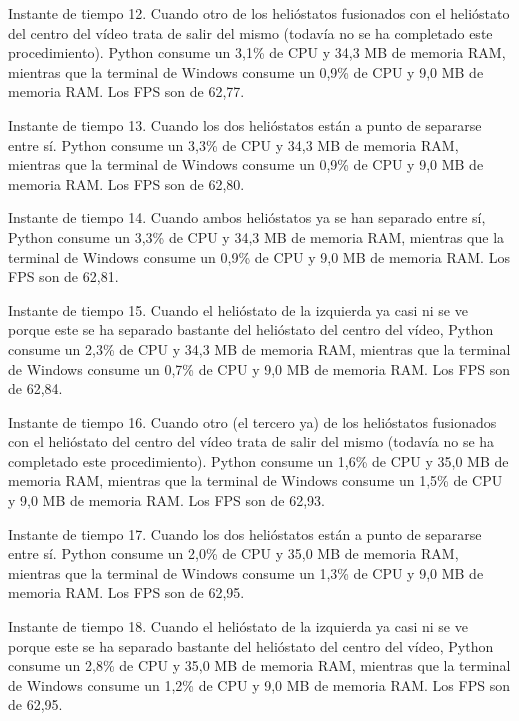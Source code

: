 \documentclass[12pt]{article}
\begin{document}
Instante de tiempo 12. Cuando otro de los helióstatos fusionados con el helióstato del centro del vídeo trata de salir del mismo (todavía no se ha completado este procedimiento). Python consume un 3,1\% de CPU y 34,3 MB de memoria RAM, mientras que la terminal de Windows consume un 0,9\% de CPU y 9,0 MB de memoria RAM. Los FPS son de 62,77.




Instante de tiempo 13. Cuando los dos helióstatos están a punto de separarse entre sí. Python consume un 3,3\% de CPU y 34,3 MB de memoria RAM, mientras que la terminal de Windows consume un 0,9\% de CPU y 9,0 MB de memoria RAM. Los FPS son de 62,80.




Instante de tiempo 14. Cuando ambos helióstatos ya se han separado entre sí, Python consume un 3,3\% de CPU y 34,3 MB de memoria RAM, mientras que la terminal de Windows consume un 0,9\% de CPU y 9,0 MB de memoria RAM. Los FPS son de 62,81.




Instante de tiempo 15. Cuando el helióstato de la izquierda ya casi ni se ve porque este se ha separado bastante del helióstato del centro del vídeo, Python consume un 2,3\% de CPU y 34,3 MB de memoria RAM, mientras que la terminal de Windows consume un 0,7\% de CPU y 9,0 MB de memoria RAM. Los FPS son de 62,84.




Instante de tiempo 16. Cuando otro (el tercero ya) de los helióstatos fusionados con el helióstato del centro del vídeo trata de salir del mismo (todavía no se ha completado este procedimiento). Python consume un 1,6\% de CPU y 35,0 MB de memoria RAM, mientras que la terminal de Windows consume un 1,5\% de CPU y 9,0 MB de memoria RAM. Los FPS son de 62,93.




Instante de tiempo 17. Cuando los dos helióstatos están a punto de separarse entre sí. Python consume un 2,0\% de CPU y 35,0 MB de memoria RAM, mientras que la terminal de Windows consume un 1,3\% de CPU y 9,0 MB de memoria RAM. Los FPS son de 62,95.




Instante de tiempo 18. Cuando el helióstato de la izquierda ya casi ni se ve porque este se ha separado bastante del helióstato del centro del vídeo, Python consume un 2,8\% de CPU y 35,0 MB de memoria RAM, mientras que la terminal de Windows consume un 1,2\% de CPU y 9,0 MB de memoria RAM. Los FPS son de 62,95.
\end{document}
